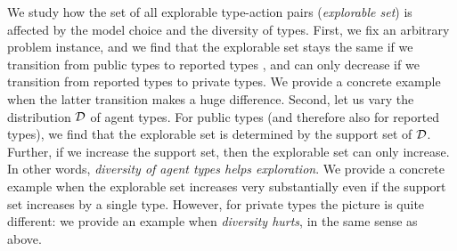We study how the set of all explorable type-action pairs (\emph{explorable set}) is affected by the model choice and the diversity of types. First, we fix an arbitrary problem instance, and we find that the explorable set stays the same if we transition from public types to reported types , and can only decrease if we transition from reported types to private types. We provide a concrete example when the latter transition makes a huge difference. Second, let us vary the distribution $\mathcal{D}$ of agent types. For public types (and therefore also for reported types), we find that the explorable set is determined by the support set of $\mathcal{D}$. Further, if we increase the support set, then the explorable set can only increase. In other words, \emph{diversity of agent types helps exploration}. We provide a concrete example when the explorable set increases very substantially even if the support set increases by a single type. However, for private types the picture is quite different: we provide an example when \emph{diversity hurts}, in the same sense as above. 